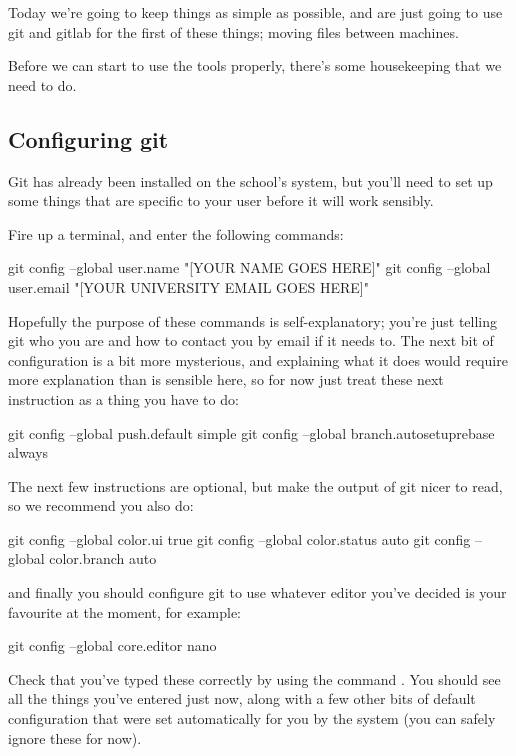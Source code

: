 Today we're going to keep things as simple as possible, and are just going to use git and gitlab for the first of these things; moving files between machines. 

Before we can start to use the tools properly, there's some housekeeping that we need to do. 

\subsection{Configuring git}

Git has already been installed on the school's system, but you'll need to set up some things that are specific to your user before it will work sensibly. 

Fire up a terminal, and enter the following commands:

\begin{ttoutenv}
git config --global user.name "[YOUR NAME GOES HERE]"
git config --global user.email "[YOUR UNIVERSITY EMAIL GOES HERE]" 
\end{ttoutenv}

Hopefully the purpose of these commands is self-explanatory; you're just telling git who you are and how to contact you by email if it needs to. The next bit of configuration is a bit more mysterious, and explaining what it does would require more explanation than is sensible here, so for now just treat these next instruction as a thing you have to do:

\begin{ttoutenv}
git config --global push.default simple
git config --global branch.autosetuprebase always 
\end{ttoutenv}

The next few instructions are optional, but make the output of git nicer to read, so we recommend you also do:

\begin{ttoutenv}
git config --global color.ui true
git config --global color.status auto
git config --global color.branch auto 
\end{ttoutenv}

and finally you should configure git to use whatever editor you've decided is your favourite at the moment, for example:

\begin{ttoutenv}
git config --global core.editor nano 
\end{ttoutenv}

Check that you've typed these correctly by using the command . You should see all the things you've entered just now, along with a few other bits of default configuration that were set automatically for you by the system (you can safely ignore these for now).


